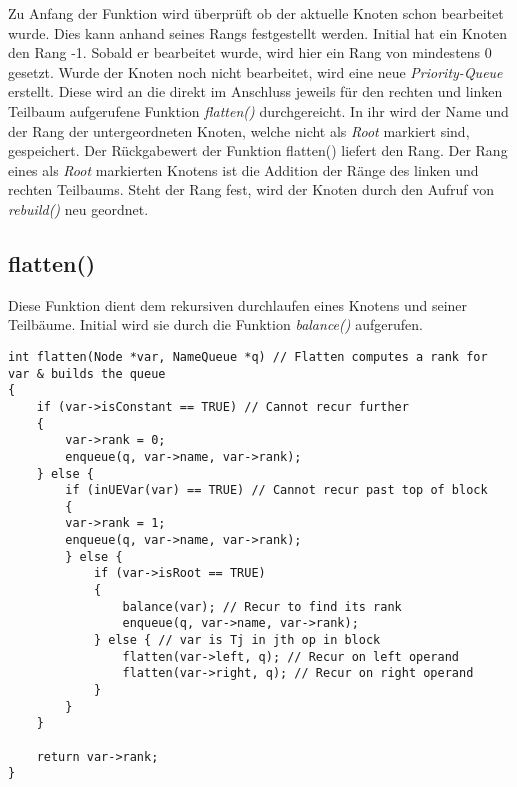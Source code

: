 Zu Anfang der Funktion wird überprüft ob der aktuelle Knoten schon bearbeitet wurde. Dies kann anhand seines Rangs festgestellt werden. Initial hat ein Knoten den Rang -1. Sobald er bearbeitet wurde, wird hier ein Rang von mindestens 0 gesetzt. Wurde der Knoten noch nicht bearbeitet, wird eine neue \textit{Priority-Queue} erstellt. Diese wird an die direkt im Anschluss jeweils für den rechten und linken Teilbaum aufgerufene Funktion \textit{flatten()} durchgereicht. In ihr wird der Name und der Rang der untergeordneten Knoten, welche nicht als \textit{Root} markiert sind, gespeichert. Der Rückgabewert der Funktion flatten() liefert den Rang. Der Rang eines als \textit{Root} markierten Knotens ist die Addition der Ränge des linken und rechten Teilbaums. Steht der Rang fest, wird der Knoten durch den Aufruf von \textit{rebuild()} neu geordnet.

\subsection{flatten()}
Diese Funktion dient dem rekursiven durchlaufen eines Knotens und seiner Teilbäume. Initial wird sie durch die Funktion \textit{balance()} aufgerufen.\\

\begin{lstlisting}[caption=Funktion flatten(), label=list:Funktion flatten()]
int flatten(Node *var, NameQueue *q) // Flatten computes a rank for var & builds the queue
{
	if (var->isConstant == TRUE) // Cannot recur further
	{
		var->rank = 0;
		enqueue(q, var->name, var->rank);
	} else {
		if (inUEVar(var) == TRUE) // Cannot recur past top of block
		{
		var->rank = 1;
		enqueue(q, var->name, var->rank);
		} else {
			if (var->isRoot == TRUE)
			{
				balance(var); // Recur to find its rank
				enqueue(q, var->name, var->rank);
			} else { // var is Tj in jth op in block
				flatten(var->left, q); // Recur on left operand
				flatten(var->right, q); // Recur on right operand
			}
		}
	}

	return var->rank;
}
\end{lstlisting}

